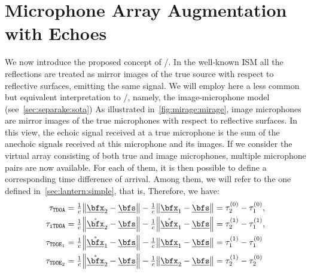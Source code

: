 \section{Microphone Array Augmentation with Echoes}\label{sec:mirage:mirage}
We now introduce the proposed concept of \MIRAGEdef/.
In the well-known \acf{ISM} all the reflections are treated as mirror images of the true source with respect to reflective surfaces, emitting the same signal.
We will employ here a less common but equivalent interpretation to \ISM/, namely, the image-microphone model (see~\cref{sec:separake:sota})
As illustrated in~\cref{fig:mirage:mirage}, image microphones are mirror images of the true microphones with respect to reflective surfaces.
In this view, the echoic signal received at a true microphone is the sum of the anechoic signals received at this microphone and its images.
If we consider the virtual array consisting of both true and image microphones, multiple microphone pairs are now available.
For each of them, it is then possible to define a corresponding time difference of arrival.
Among them, we will refer to the one defined in~\cref{sec:lantern:simple}, that is,
Therefore, we have:%
\begin{equation}
    \begin{aligned}
        \tau_\mathtt{TDOA}  &= \tfrac{1}{c} \norm{\positionMicrophone_2 - \positionSource} - \tfrac{1}{c} \norm{\positionMicrophone_1 - \positionSource} = \tau_2^{(0)} - \tau_1^{(0)},\\
        \tau_\mathtt{iTDOA} &= \tfrac{1}{c} \norm{\mathring{\positionMicrophone}_2 - \positionSource} - \tfrac{1}{c} \norm{\mathring{\positionMicrophone}_1 - \positionSource} = \tau_2^{(1)} - \tau_1^{(1)},\\
        \tau_{\mathtt{TDOE}_1}  &= \tfrac{1}{c} \norm{\mathring{\positionMicrophone}_1 - \positionSource} - \tfrac{1}{c} \norm{\positionMicrophone_1 - \positionSource} = \tau_1^{(1)} - \tau_1^{(0)}\\
        \tau_{\mathtt{TDOE}_2}  &= \tfrac{1}{c} \norm{\mathring{\positionMicrophone}_2 - \positionSource} - \tfrac{1}{c} \norm{\positionMicrophone_2 - \positionSource} = \tau_2^{(1)} - \tau_2^{(0)}
    \end{aligned}
\end{equation}
